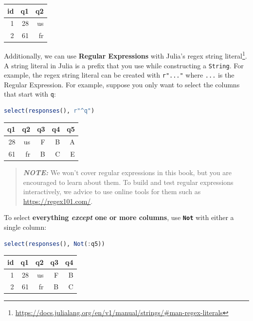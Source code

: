 \documentclass[
  notoc %
]{tufte-book}
\DeclareRobustCommand{\href}[2]{#2\footnote{\url{#1}}}
\newcommand{\passthrough}[1]{#1}
\begin{document}
\begin{longtable}[]{@{}rrr@{}}
\toprule()
id & q1 & q2 \\
\midrule()
\endhead
1 & 28 & us \\
2 & 61 & fr \\
\bottomrule()
\end{longtable}

Additionally, we can use \textbf{Regular Expressions} with
\href{https://docs.julialang.org/en/v1/manual/strings/\#man-regex-literals}{Julia's
regex string literal}. A string literal in Julia is a prefix that you
use while constructing a \passthrough{\lstinline!String!}. For example,
the regex string literal can be created with
\passthrough{\lstinline!r"..."!} where \passthrough{\lstinline!...!} is
the Regular Expression. For example, suppose you only want to select the
columns that start with \passthrough{\lstinline!q!}:

\begin{lstlisting}[language=Julia]
select(responses(), r"^q")
\end{lstlisting}

\begin{longtable}[]{@{}rrrrr@{}}
\toprule()
q1 & q2 & q3 & q4 & q5 \\
\midrule()
\endhead
28 & us & F & B & A \\
61 & fr & B & C & E \\
\bottomrule()
\end{longtable}

\begin{quote}
\textbf{\emph{NOTE:}} We won't cover regular expressions in this book,
but you are encouraged to learn about them. To build and test regular
expressions interactively, we advice to use online tools for them such
as \url{https://regex101.com/}.
\end{quote}

To select \textbf{everything \emph{except} one or more columns}, use
\textbf{\passthrough{\lstinline!Not!}} with either a single column:

\begin{lstlisting}[language=Julia]
select(responses(), Not(:q5))
\end{lstlisting}

\begin{longtable}[]{@{}rrrrr@{}}
\toprule()
id & q1 & q2 & q3 & q4 \\
\midrule()
\endhead
1 & 28 & us & F & B \\
2 & 61 & fr & B & C \\
\bottomrule()
\end{longtable}
\end{document}
